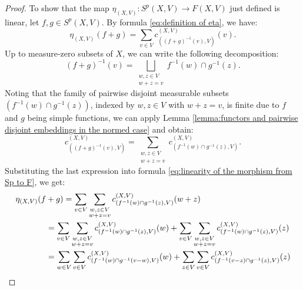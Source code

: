\documentclass{amsart}
\theoremstyle{definition}
\theoremstyle{plain}
\begin{document}
\begin{proof}
            To show that the map $\eta_{(X,V)} \colon S^p(X,V) \rightarrow F(X,V)$ just defined is linear, let $f,g \in S^p(X,V)$. By formula \eqref{eq:definition of eta}, we have:
            \begin{equation}
            \label{eq:linearity of the morphism from Sp to F}
                \eta_{(X,V)}(f + g) = \sum_{v \in V} c_{\left( (f + g)^{-1}(v),V \right)}^{(X,V)}(v). 
            \end{equation}
            Up to measure-zero subsets of $X$, we can write the following decomposition: 
            \begin{equation*}
                (f + g)^{-1}(v) = \bigsqcup_{\substack{w,z \in V \\ w + z = v}} f^{-1}(w) \cap g^{-1}(z).
            \end{equation*}
            Noting that the family of pairwise disjoint measurable subsets $\left( f^{-1}(w) \cap g^{-1}(z) \right)$, indexed by $w,z \in V$ with $w + z = v$, is finite due to $f$ and $g$ being simple functions, we can apply Lemma \ref{lemma:functors and pairwise disjoint embeddings in the normed case} and obtain:
            \begin{equation*}
                c_{\left( (f + g)^{-1}(v),V \right)}^{(X,V)} = \sum_{\substack{w,z \in V \\ w + z = v}} c_{\left( f^{-1}(w) \cap g^{-1}(z),V \right)}^{(X,V)}.
            \end{equation*}
            Substituting the last expression into formula \eqref{eq:linearity of the morphism from Sp to F}, we get:
            \begin{align}
                \eta_{(X,V)}(f &+ g) = \sum_{v \in V} \sum_{\substack{w,z\in V \\ w + z = v}} c_{\left( f^{-1}(w)\cap g^{-1}(z),V \right)}^{(X,V)}(w + z) \notag \\
                &= \sum_{v \in V} \sum_{\substack{w,z \in V \\ w + z = v}} c_{\left( f^{-1}(w) \cap g^{-1}(z),V \right)}^{(X,V)}(w) + \sum_{v \in V} \sum_{\substack{w,z \in V \\ w + z = v}} c_{\left( f^{-1}(w)\cap g^{-1}(z),V \right)}^{(X,V)}(z) \label{eq:use linearity of the map c} \\
                &= \sum_{w \in V} \sum_{v \in V} c_{\left( f^{-1}(w) \cap g^{-1}(v - w),V \right)}^{(X,V)}(w) + \sum_{z \in V} \sum_{v \in V} c_{\left( f^{-1}(v-z) \cap g^{-1}(z),V \right)}^{(X,V)}(z) \label{eq:rename the indices in the summations} \\

\end{align}
\end{proof}
\end{document}
